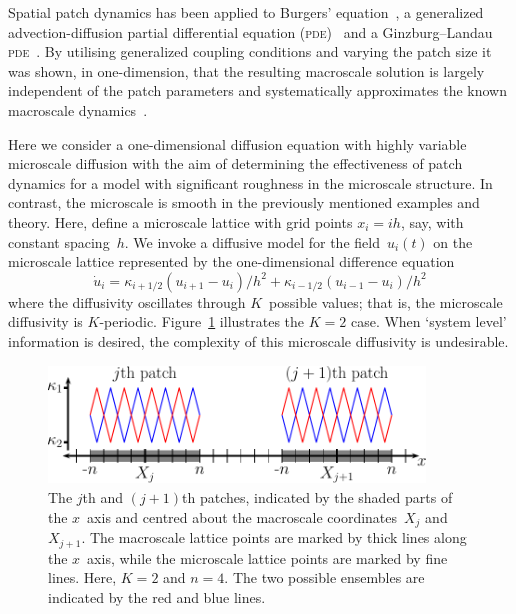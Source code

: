 \documentclass[12pt,a4paper]{article}
\begin{document}
Spatial patch dynamics has been applied to Burgers' equation~\cite{Roberts01}, a generalized advection-diffusion partial differential equation (\textsc{pde})~\cite{Roberts03} and a Ginzburg--Landau \textsc{pde}~\cite{Roberts11}. By utilising generalized coupling conditions and varying the patch size it was shown, in one-dimension, that the resulting macroscale solution is largely independent of the patch parameters and systematically approximates the known macroscale dynamics~\cite{Roberts07}. 

Here we consider a one-dimensional diffusion equation with highly variable microscale diffusion with the aim of determining the effectiveness of patch dynamics for a model with significant roughness in the microscale structure. In contrast, the microscale is smooth in the previously mentioned examples and theory. Here, define a microscale lattice with grid points $x_i=ih$, say, with constant spacing~$h$. We invoke a diffusive model for the field~$u_i(t)$ on the microscale lattice represented by the one-dimensional difference equation
\begin{equation}
\dot{u}_i=\kappa_{i+1/2}(u_{i+1}-u_i)/h^2+\kappa_{i-1/2}(u_{i-1}-u_i)/h^2\label{eq:pde}
\end{equation}
where the diffusivity oscillates through $K$~possible values; that is, the microscale diffusivity is $K$-periodic. Figure~\ref{fig:zigzag} illustrates the $K=2$ case. When `system level' information is desired, the complexity of this microscale diffusivity is undesirable.

\begin{figure}
\centering
\includegraphics[width=10cm]{zigzagk3}
\caption{The $j$th and $(j+1)$th patches, indicated by the shaded parts of the $x$~axis and centred about the macroscale coordinates~$X_j$ and~$X_{j+1}$. The macroscale lattice points are marked by thick lines along the $x$~axis, while the microscale lattice points are marked by fine lines.
Here, $K=2$ and $n=4$. The two possible ensembles are indicated by the red and blue lines.}
\label{fig:zigzag}
\end{figure}
\end{document}

